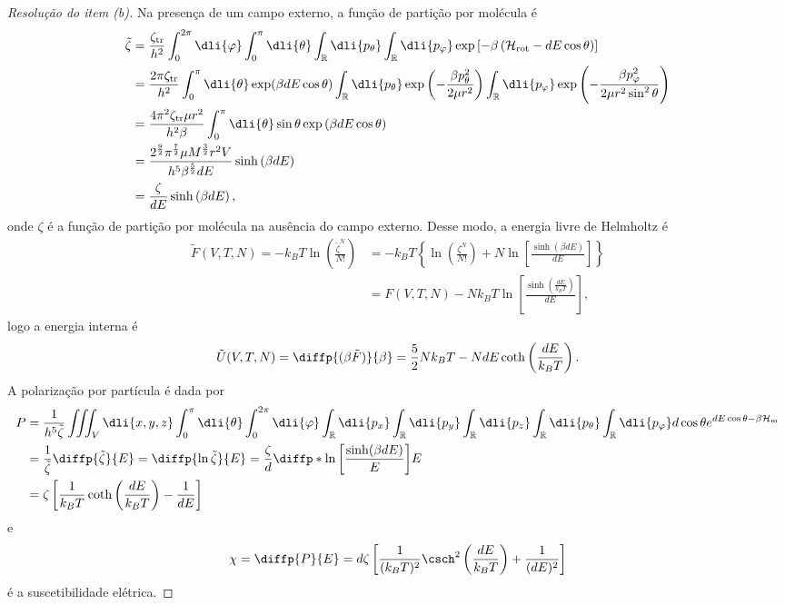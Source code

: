 \begin{proof}[Resolução do item (b)]
    Na presença de um campo externo, a função de partição por molécula é
    \begin{align*}
        \tilde{\zeta} &= \frac{\zeta_{\mathrm{tr}}}{h^2}\int_0^{2\pi} \dli{\varphi} \int_0^\pi \dli{\theta} \int_{\mathbb{R}}\dli{p_\theta} \int_{\mathbb{R}}\dli{p_{\varphi}} \exp\left[-\beta\left(\mathcal{H}_{\mathrm{rot}}-d E \cos\theta\right)\right]\\
              &= \frac{2\pi\zeta_{\mathrm{tr}}}{h^2} \int_0^\pi \dli{\theta} \exp(\beta d E \cos\theta) \int_{\mathbb{R}}\dli{p_\theta} \exp\left(-\frac{\beta p_\theta^2}{2\mu r^2}\right) \int_{\mathbb{R}}\dli{p_{\varphi}}\exp\left(-\frac{\beta p_{\varphi}^2}{2\mu r^2 \sin^2\theta}\right)\\
              &= \frac{4\pi^2 \zeta_{\mathrm{tr}} \mu r^2}{h^2 \beta} \int_0^\pi \dli{\theta} \sin\theta \exp\left(\beta d E \cos\theta\right)\\
              &= \frac{2^{\frac92}\pi^{\frac72} \mu M^{\frac32}r^2V}{h^5 \beta^{\frac52} d E} \sinh\left(\beta d E\right)\\
              &= \frac{\zeta}{dE} \sinh\left(\beta dE\right),
    \end{align*}
    onde \(\zeta\) é a função de partição por molécula na ausência do campo externo. Desse modo, a energia livre de Helmholtz é
    \begin{align*}
        \tilde{F}(V, T, N) = -k_BT \ln \left(\frac{\tilde{\zeta}^N}{N!}\right)
        &= -k_B T \left\{\ln\left(\frac{\zeta^N}{N!}\right) + N\ln\left[\frac{\sinh\left(\beta d E\right)}{d E}\right]\right\}\\
        &= F(V, T, N) - N k_B T\ln\left[\frac{\sinh\left(\frac{d E}{k_BT}\right)}{d E}\right],
    \end{align*}
    logo a energia interna é
    \begin{equation*}
        \tilde{U}(V, T, N) = \diffp{(\beta \tilde{F})}{\beta} = \frac52 N k_B T - N d E\coth\left(\frac{dE}{k_BT}\right).
    \end{equation*}
    A polarização por partícula é dada por
    \begin{align*}
        P &= \frac{1}{h^5 \tilde{\zeta}} \iiint_V \dli{x,y,z} \int_0^\pi \dli{\theta}\int_0^{2\pi} \dli{\varphi} \int_{\mathbb{R}} \dli{p_x} \int_{\mathbb{R}} \dli{p_y} \int_{\mathbb{R}} \dli{p_z} \int_{\mathbb{R}} \dli{p_\theta} \int_{\mathbb{R}} \dli{p_{\varphi}} d \cos\theta e^{dE\cos\theta-\beta \mathcal{H}_{\mathrm{m}}}\\
          &= \frac{1}{\tilde{\zeta}} \diffp{\tilde{\zeta}}{E} = \diffp{\ln \tilde{\zeta}}{E} = \frac{\zeta}{d} \diffp*{\ln\left[\frac{\sinh( \beta d E)}{E}\right]}{E}\\
          &= \zeta\left[\frac{1}{k_B T} \coth\left(\frac{d E}{k_B T}\right) - \frac{1}{d E}\right]
    \end{align*}
    e
    \begin{equation*}
        \chi = \diffp{P}{E} = d\zeta\left[\frac{1}{(k_BT)^2}\csch^2\left(\frac{dE}{k_BT}\right) + \frac{1}{(dE)^2}\right]
    \end{equation*}
    é a suscetibilidade elétrica.
\end{proof}
